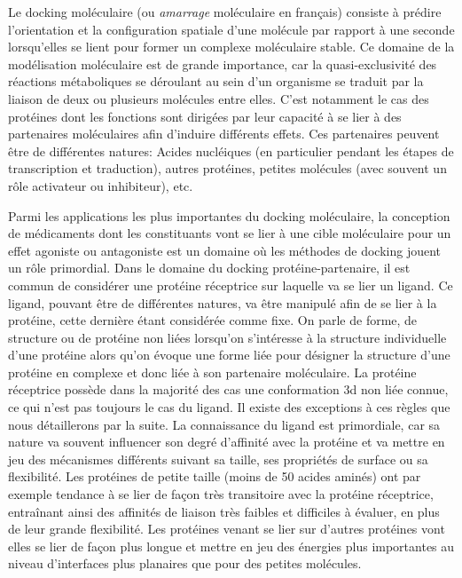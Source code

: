 Le docking moléculaire (ou \textit{amarrage} moléculaire en français) consiste à prédire l'orientation et la configuration spatiale d'une molécule par rapport à une seconde lorsqu’elles se lient pour former un complexe moléculaire stable. Ce domaine de la modélisation moléculaire est de grande importance, car la quasi-exclusivité des réactions métaboliques se déroulant au sein d'un organisme se traduit par la liaison de deux ou plusieurs molécules entre elles. C'est notamment le cas des protéines dont les fonctions sont dirigées par leur capacité à se lier à des partenaires moléculaires afin d'induire différents effets. Ces partenaires peuvent être de différentes natures: Acides nucléiques (en particulier pendant les étapes de transcription et traduction), autres protéines, petites molécules (avec souvent un rôle activateur ou inhibiteur), etc.

Parmi les applications les plus importantes du docking moléculaire, la conception de médicaments dont les constituants vont se lier à une cible moléculaire pour un effet agoniste ou antagoniste est un domaine où les méthodes de docking jouent un rôle primordial.
Dans le domaine du docking protéine-partenaire, il est commun de considérer une protéine réceptrice sur laquelle va se lier un ligand. Ce ligand, pouvant être de différentes natures, va être manipulé afin de se lier à la protéine, cette dernière étant considérée comme fixe. On parle de forme, de structure ou de protéine non liées lorsqu'on s'intéresse à la structure individuelle d'une protéine alors qu'on évoque une forme liée pour désigner la structure d'une protéine en complexe et donc liée à son partenaire moléculaire. 
La protéine réceptrice possède dans la majorité des cas une conformation 3d non liée connue, ce qui n'est pas toujours le cas du ligand. Il existe des exceptions à ces règles que nous détaillerons par la suite. La connaissance du ligand est primordiale, car sa nature va souvent influencer son degré d'affinité avec la protéine et va mettre en jeu des mécanismes différents suivant sa taille, ses propriétés de surface ou sa flexibilité. Les protéines de petite taille (moins de 50 acides aminés) ont par exemple tendance à se lier de façon très transitoire avec la protéine réceptrice, entraînant ainsi des affinités de liaison très faibles et difficiles à évaluer, en plus de leur grande flexibilité. Les protéines venant se lier sur d'autres protéines vont elles se lier de façon plus longue et mettre en jeu des énergies plus importantes au niveau d'interfaces plus planaires que pour des petites molécules.

